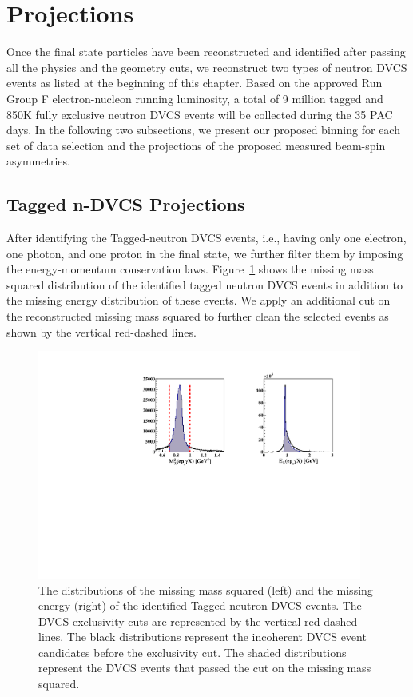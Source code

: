 \section{Projections}
Once the final state particles have been reconstructed and identified after 
passing all the physics and the geometry cuts, we reconstruct two types of 
neutron DVCS events as listed at the beginning of this chapter. Based on the 
approved  Run Group F electron-nucleon running luminosity, a total of 9 million 
tagged and 850K fully exclusive neutron DVCS events will be collected during 
the 35 PAC days. In the following two subsections, we present our proposed 
binning for each set of data selection and the projections of the proposed 
measured beam-spin asymmetries.  



\subsection{Tagged n-DVCS Projections}
After identifying the Tagged-neutron DVCS events, i.e., having only one 
electron, one photon, and one proton in the final state, we further filter them 
by imposing the energy-momentum conservation laws.  
Figure~\ref{fig:tagged_exclusive} shows the missing mass squared distribution 
of the identified tagged neutron DVCS events in addition to the missing energy 
distribution of these events. We apply an additional cut on the reconstructed 
missing mass squared to further clean the selected events as shown by the 
vertical red-dashed lines. 

\begin{figure}[htb]
  \centering
    \includegraphics[width=0.95\textwidth,clip]{figs/all_inincoh_exc_cuts.pdf}
  \caption{The distributions of the missing mass squared (left) and the missing 
   energy (right) of the identified Tagged neutron DVCS events. The DVCS 
   exclusivity cuts are represented by the vertical red-dashed lines. The black 
   distributions represent the incoherent DVCS event candidates before the 
   exclusivity cut. The shaded distributions represent the DVCS events that 
   passed the cut on the missing mass squared.
   \label{fig:tagged_exclusive}}
\end{figure}

